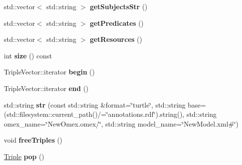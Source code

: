 \begin{DoxyCompactItemize}
\item 
\mbox{\label{classomexmeta_1_1Triples_a5234882414a2aaaca603eacd805df3d6}} 
std\+::vector$<$ std\+::string $>$ {\bfseries get\+Subjects\+Str} ()
\item 
\mbox{\label{classomexmeta_1_1Triples_a63639c08caac19e6c5cbf30bb28292d0}} 
std\+::vector$<$ std\+::string $>$ {\bfseries get\+Predicates} ()
\item 
\mbox{\label{classomexmeta_1_1Triples_aa875120a73cb1618be9e699e8bfb08c4}} 
std\+::vector$<$ std\+::string $>$ {\bfseries get\+Resources} ()
\item 
\mbox{\label{classomexmeta_1_1Triples_adc86427b3563d04849336a8da7566451}} 
int {\bfseries size} () const
\item 
\mbox{\label{classomexmeta_1_1Triples_aa6735eb506ff0d5a3179fab3af3b2602}} 
Triple\+Vector\+::iterator {\bfseries begin} ()
\item 
\mbox{\label{classomexmeta_1_1Triples_a4312337b242280bcb119908c0334bfd8}} 
Triple\+Vector\+::iterator {\bfseries end} ()
\item 
\mbox{\label{classomexmeta_1_1Triples_ad2510c5b335b0266b05507c53bcc64af}} 
std\+::string {\bfseries str} (const std\+::string \&format=\char`\"{}turtle\char`\"{}, std\+::string base=(std\+::filesystem\+::current\+\_\+path()/=\char`\"{}annotations.\+rdf\char`\"{}).string(), std\+::string omex\+\_\+name=\char`\"{}New\+Omex.\+omex/\char`\"{}, std\+::string model\+\_\+name=\char`\"{}New\+Model.\+xml\#\char`\"{})
\item 
\mbox{\label{classomexmeta_1_1Triples_ad0c5839b0f49d6427cf53004baf9b0f4}} 
void {\bfseries free\+Triples} ()
\item 
\mbox{\label{classomexmeta_1_1Triples_a5dad8f2cde0a3f6c0ce341338f80b0cd}} 
\hyperlink{classomexmeta_1_1Triple}{Triple} {\bfseries pop} ()
\item 
\mbox{\label{classomexmeta_1_1Triples_a43d540423a436986d9f72d7cf0f02d72}} 

\end{DoxyCompactItemize}
